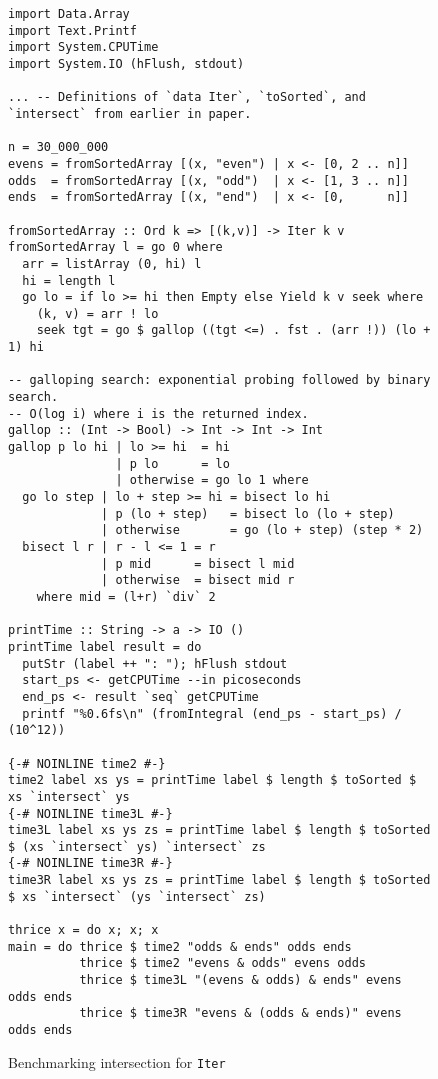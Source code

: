 \documentclass[acmsmall,screen,review,anonymous,dvipsnames,svgnames]{acmart}
\newcommand\hask[1]{\texttt{#1}}
\begin{document}

\begin{figure}
  \begin{verbatim}
import Data.Array
import Text.Printf
import System.CPUTime
import System.IO (hFlush, stdout)

... -- Definitions of `data Iter`, `toSorted`, and `intersect` from earlier in paper.

n = 30_000_000
evens = fromSortedArray [(x, "even") | x <- [0, 2 .. n]]
odds  = fromSortedArray [(x, "odd")  | x <- [1, 3 .. n]]
ends  = fromSortedArray [(x, "end")  | x <- [0,      n]]

fromSortedArray :: Ord k => [(k,v)] -> Iter k v
fromSortedArray l = go 0 where
  arr = listArray (0, hi) l
  hi = length l
  go lo = if lo >= hi then Empty else Yield k v seek where
    (k, v) = arr ! lo
    seek tgt = go $ gallop ((tgt <=) . fst . (arr !)) (lo + 1) hi

-- galloping search: exponential probing followed by binary search.
-- O(log i) where i is the returned index.
gallop :: (Int -> Bool) -> Int -> Int -> Int
gallop p lo hi | lo >= hi  = hi
               | p lo      = lo
               | otherwise = go lo 1 where
  go lo step | lo + step >= hi = bisect lo hi
             | p (lo + step)   = bisect lo (lo + step)
             | otherwise       = go (lo + step) (step * 2)
  bisect l r | r - l <= 1 = r
             | p mid      = bisect l mid
             | otherwise  = bisect mid r
    where mid = (l+r) `div` 2

printTime :: String -> a -> IO ()
printTime label result = do
  putStr (label ++ ": "); hFlush stdout
  start_ps <- getCPUTime --in picoseconds
  end_ps <- result `seq` getCPUTime
  printf "%0.6fs\n" (fromIntegral (end_ps - start_ps) / (10^12))

{-# NOINLINE time2 #-}
time2 label xs ys = printTime label $ length $ toSorted $ xs `intersect` ys
{-# NOINLINE time3L #-}
time3L label xs ys zs = printTime label $ length $ toSorted $ (xs `intersect` ys) `intersect` zs
{-# NOINLINE time3R #-}
time3R label xs ys zs = printTime label $ length $ toSorted $ xs `intersect` (ys `intersect` zs)

thrice x = do x; x; x
main = do thrice $ time2 "odds & ends" odds ends
          thrice $ time2 "evens & odds" evens odds
          thrice $ time3L "(evens & odds) & ends" evens odds ends
          thrice $ time3R "evens & (odds & ends)" evens odds ends
  \end{verbatim}
  \caption{Benchmarking intersection for \hask{Iter}}
  \label{fig:iter-benchmark}
\end{figure}
\end{document}
